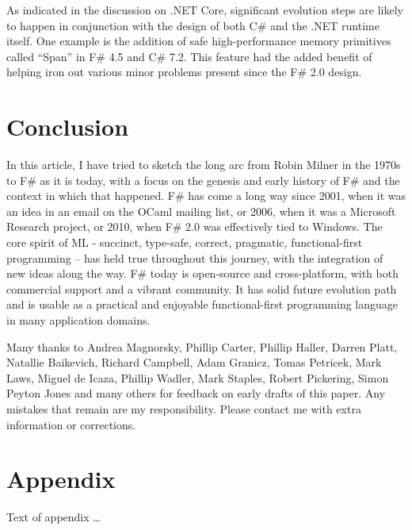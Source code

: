\documentclass[acmsmall,review]{acmart}\settopmatter{printfolios=true,printccs=false,printacmref=false}
\begin{document}
As indicated in the discussion on .NET Core, significant evolution steps are likely to happen in conjunction with the design of both C\# and the .NET runtime itself.  One example is the addition of safe high-performance memory primitives called “Span” in F\# 4.5 and C\# 7.2.  This feature had the added benefit of helping iron out various minor problems present since the F\# 2.0 design.

\section*{Conclusion}

In this article, I have tried to sketch the long arc from Robin Milner in the 1970s to F\# as it is today, with a focus on the genesis and early history of F\# and the context in which that happened. F\# has come a long way since 2001, when it was an idea in an email on the OCaml mailing list, or 2006, when it was a Microsoft Research project, or 2010, when F\# 2.0 was effectively tied to Windows. The core spirit of ML - succinct, type-safe, correct, pragmatic, functional-first programming – has held true throughout this journey, with the integration of new ideas along the way.  F\# today is open-source and cross-platform, with both commercial support and a vibrant community. It has solid future evolution path and is usable as a practical and enjoyable functional-first programming language in many application domains.  





\begin{acks}                            %

Many thanks to Andrea Magnorsky, Phillip Carter, Phillip Haller, Darren Platt, Natallie Baikevich, Richard Campbell, Adam Granicz, Tomas Petricek, Mark Laws, Miguel de Icaza, Phillip Wadler, Mark Staples, Robert Pickering, Simon Peyton Jones and many others for feedback on early drafts of this paper.  Any mistakes that remain are my responsibility. Please contact me with extra information or corrections.

\end{acks}





\appendix
\section*{Appendix}

Text of appendix \ldots
\end{document}
